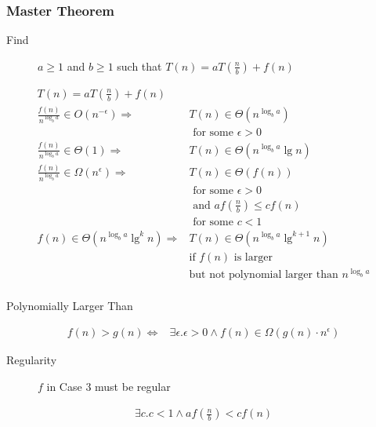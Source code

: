 \documentclass[10pt, a4paper,landscape]{article}
\begin{document}
\begin{multicols*}{4}
\subsubsection{Master Theorem}
\begin{description}
    \item[Find] $a \geq 1$ and $b \geq 1$ such that $T(n) = a T\left(\frac n b\right) + f(n)$
\end{description}
\begin{align*}
    T(n) = a T\left(\frac n b\right) + f(n) \\
    \frac{f(n)}{n^{\log_b a}} \in O(n^{-\epsilon})  \Rightarrow& T(n) \in \Theta(n^{\log_b a})\\ &\text{ for some } \epsilon > 0 \\
    \frac{f(n)}{n^{\log_b a}} \in \Theta(1) \Rightarrow& T(n) \in \Theta(n^{\log_b a} \lg n) \\
    \frac{f(n)}{n^{\log_b a}} \in \Omega(n^{\epsilon}) \Rightarrow& T(n) \in \Theta(f(n))\\ &\text{ for some } \epsilon > 0 \\&\text{ and } af(\frac{n}{b}) \leq cf(n)\\ &\text{ for some } c < 1 \\
    f(n) \in \Theta(n^{\log_b a} \lg^{k} n) \Rightarrow& T(n) \in \Theta(n^{\log_b a} \lg^{k + 1} n)\\ &\text{if } f(n) \text{ is larger}\\ &\text{but not polynomial larger than } n^{\log_b a}\\
\end{align*}

\begin{description}
    \item[Polynomially Larger Than]
\end{description}
\begin{align*}
    f(n) > g(n) \Leftrightarrow& \exists \epsilon. \epsilon > 0 \land f(n) \in \Omega(g(n) \cdot n^\epsilon)
\end{align*}

\begin{description}
    \item[Regularity] $f$ in Case 3 must be regular
\end{description}
\begin{align*}
    \exists c. c < 1 \land af\left(\frac n b\right) < cf(n)\\
\end{align*}


\end{multicols*}
\end{document}
